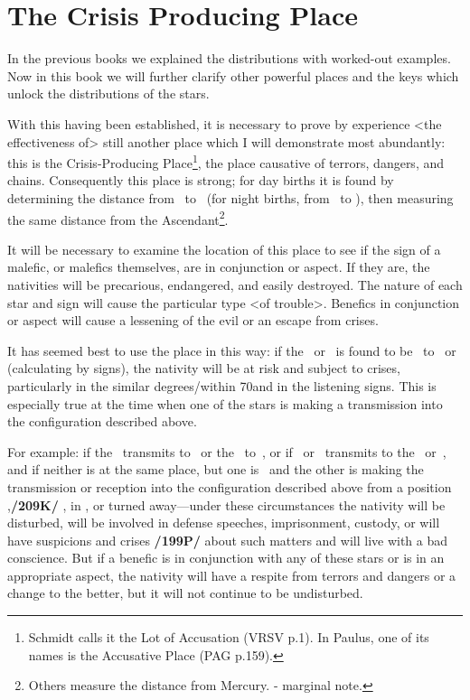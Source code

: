 \section{The Crisis Producing Place}

In the previous books we explained the distributions with worked-out examples. Now in this book we will further clarify other powerful places and the keys which unlock the distributions of the stars.

With this having been established, it is necessary to prove by experience <the effectiveness of> still another place which I will demonstrate most abundantly: this is the Crisis-Producing Place\footnote{Schmidt calls it the Lot of Accusation (VRSV p.1). In Paulus, one of its names is the Accusative Place (PAG p.159).}, the place causative of terrors, dangers, and chains. Consequently this place is strong; for day births it is found by determining the distance from \Saturn\, to \Mars\, (for night births, from \Mars\, to \Saturn), then measuring the same distance from the Ascendant\footnote{Others measure the distance from Mercury. - marginal note.}.

It will be necessary to examine the location of this place to see if the
sign of a malefic, or malefics themselves, are in conjunction or aspect. If they are, the nativities will be precarious, endangered, and easily destroyed. The nature of each star and sign will cause the particular type <of trouble>. Benefics in conjunction or aspect will cause a lessening of the evil or an escape from crises.

It has seemed best to use the place in this way: if the \Sun\, or \Moon\, is found to be \Sextile\, to \Saturn\, or \Mars\, (calculating by signs), the nativity will be at risk and subject to crises, particularly in the similar degrees/within 70\deg and in the listening signs. This is especially true at the time when one of the stars is making a transmission into the configuration described above. 

For example: if the \Sun\, transmits to \Saturn\,
or the \Moon\, to \Mars\,, or if \Saturn\, or \Mars\, transmits to the \Sun\, or \Moon\,, and if neither is at the same place, but one is \Sextile\, and the other is making the transmission or reception into the configuration described
above from a position \Square,\textbf{/209K/} \Trine, in \Opposition, or turned away—under these circumstances the nativity will be disturbed, will be involved in defense speeches, imprisonment, custody, or will have suspicions and crises \textbf{/199P/} about such matters and will live with a bad conscience. But if a benefic is in conjunction with any of these stars or is in an appropriate aspect, the nativity will have a respite from terrors and dangers or a change to the better, but it will not continue to be undisturbed. 

